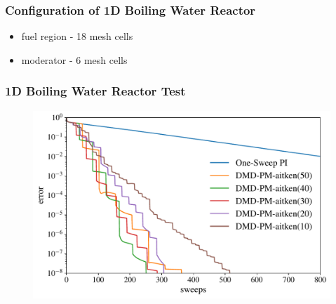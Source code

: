 \documentclass[fleqn]{beamer}
\begin{document}
\begin{frame}
\frametitle{Configuration of 1D Boiling Water Reactor \footnotemark }
\begin{figure}
\centering
\begin{minipage}[c]{\textwidth}
    \centering
    
\end{minipage}
\begin{minipage}[c]{\textwidth}
    \centering
    
\end{minipage}
\begin{minipage}[c]{\textwidth}
    \centering
    
\end{minipage}
\label{fig:BWRconfig}
\end{figure}
\begin{block}{}
\begin{itemize}
    \item fuel region - 18 mesh cells
    \item moderator - 6 mesh cells
\end{itemize}
\end{block}
\end{frame}

\begin{frame}
\frametitle{1D Boiling Water Reactor Test}
\begin{figure}
\centering
\includegraphics[scale=0.5]{figures/dmd_ospi_semilog_1d.pdf}
\end{figure}
\end{frame}
\end{document}
